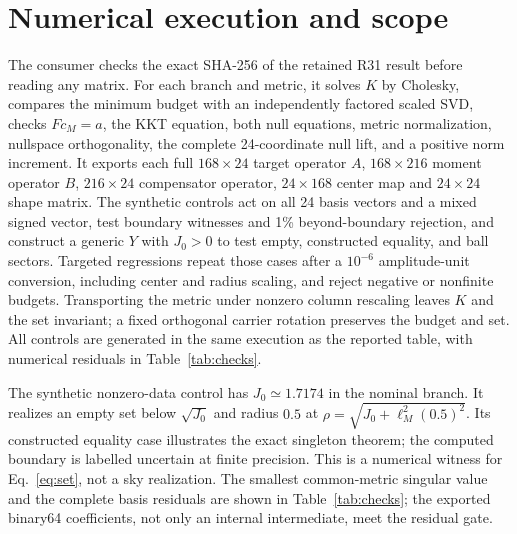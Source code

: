 \documentclass[aps,prd,onecolumn,11pt,nofootinbib,notitlepage]{revtex4-2}
\begin{document}
\section{Numerical execution and scope}

The consumer checks the exact SHA-256 of the retained R31 result before reading any matrix. For each branch and metric, it solves $K$ by Cholesky, compares the minimum budget with an independently factored scaled SVD, checks $Fc_M=a$, the KKT equation, both null equations, metric normalization, nullspace orthogonality, the complete 24-coordinate null lift, and a positive norm increment. It exports each full $168\times24$ target operator $A$, $168\times216$ moment operator $B$, $216\times24$ compensator operator, $24\times168$ center map and $24\times24$ shape matrix. The synthetic controls act on all 24 basis vectors and a mixed signed vector, test boundary witnesses and 1\% beyond-boundary rejection, and construct a generic $Y$ with $J_0>0$ to test empty, constructed equality, and ball sectors. Targeted regressions repeat those cases after a $10^{-6}$ amplitude-unit conversion, including center and radius scaling, and reject negative or nonfinite budgets. Transporting the metric under nonzero column rescaling leaves $K$ and the set invariant; a fixed orthogonal carrier rotation preserves the budget and set. All controls are generated in the same execution as the reported table, with numerical residuals in Table~\ref{tab:checks}.

\begin{table}[t]
\caption{Smallest resolved singular value, relative $Fc=a$ residuals under both declared metrics, and largest relative full-tensor basis-action residual $\max_j\epsilon_j$ for the common-metric compensator. The residual gate is $10^{-10}$ for $Fc=a$ and $10^{-9}$ for the complete tensor actions.}
\label{tab:checks}
\centering
\end{table}

The synthetic nonzero-data control has $J_0\simeq1.7174$ in the nominal branch. It realizes an empty set below $\sqrt{J_0}$ and radius $0.5$ at $\rho=\sqrt{J_0+\ell_M^2(0.5)^2}$. Its constructed equality case illustrates the exact singleton theorem; the computed boundary is labelled uncertain at finite precision. This is a numerical witness for Eq.~\eqref{eq:set}, not a sky realization. The smallest common-metric singular value and the complete basis residuals are shown in Table~\ref{tab:checks}; the exported binary64 coefficients, not only an internal intermediate, meet the residual gate.
\end{document}
